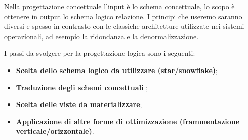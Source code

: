 Nella progettazione concettuale l'input è lo schema concettuale, lo scopo è ottenere in output lo schema logico relazione. I principi che useremo saranno diversi e spesso in contrasto con le classiche architetture utilizzate nei sistemi operazionali, ad esempio la ridondanza e la denormalizzazione.

I passi da svolgere per la progettazione logica sono i seguenti:
\begin{itemize}
	\item \textbf{Scelta dello schema logico da utilizzare (star/snowflake)};
	\item \textbf{Traduzione degli schemi concettuali} ;
	\item \textbf{Scelta delle viste da materializzare};
	\item \textbf{Applicazione di altre forme di ottimizzazione (frammentazione verticale/orizzontale)}.
\end{itemize}

